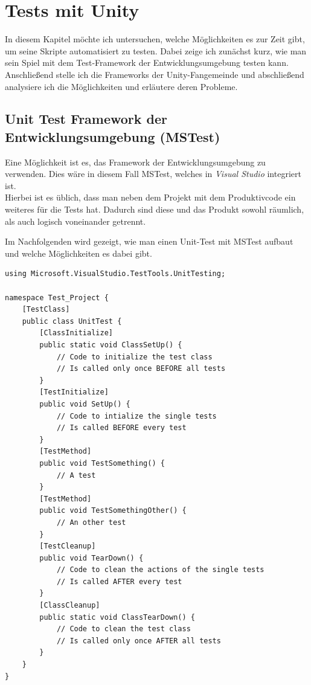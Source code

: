 \chapter{Tests mit Unity}
\label{sec:Tests mit Unity}

In diesem Kapitel möchte ich untersuchen, welche Möglichkeiten es zur Zeit gibt, um seine Skripte automatisiert zu testen. Dabei zeige ich zunächst kurz, wie man sein Spiel mit dem Test-Framework der Entwicklungsumgebung testen kann. Anschließend stelle ich die Frameworks der Unity-Fangemeinde und abschließend analysiere ich die Möglichkeiten und erläutere deren Probleme.

\section{Unit Test Framework der Entwicklungsumgebung (MSTest)}

Eine Möglichkeit ist es, das Framework der Entwicklungsumgebung zu verwenden. Dies wäre in diesem Fall MSTest, welches in \textit{Visual Studio} integriert ist.\\
Hierbei ist es üblich, dass man neben dem Projekt mit dem Produktivcode ein weiteres für die Tests hat. Dadurch sind diese und das Produkt sowohl räumlich, als auch logisch voneinander getrennt.

Im Nachfolgenden wird gezeigt, wie man einen Unit-Test mit MSTest aufbaut und welche Möglichkeiten es dabei gibt.

\pagebreak
\begin{lstlisting}[caption={[Unit Test mit MSTest]Unit Test mit MSTest\\
Beispiel einer Testklasse in MSTest. Zeigt wie man ihre Testmethoden deklariert und wie sie initialisiert wird.}, label=code:UnitTestMitMSTest]
using Microsoft.VisualStudio.TestTools.UnitTesting;

namespace Test_Project {
	[TestClass]
	public class UnitTest {
		[ClassInitialize]
		public static void ClassSetUp() {
			// Code to initialize the test class
			// Is called only once BEFORE all tests
		}
		[TestInitialize]
		public void SetUp() {
			// Code to intialize the single tests
			// Is called BEFORE every test
		}
		[TestMethod]
		public void TestSomething() {
			// A test
		}			
		[TestMethod]
		public void TestSomethingOther() {
			// An other test
		}
		[TestCleanup]
		public void TearDown() {
			// Code to clean the actions of the single tests
			// Is called AFTER every test
		}
		[ClassCleanup]
		public static void ClassTearDown() {
			// Code to clean the test class
			// Is called only once AFTER all tests
		}
	}
}
\end{lstlisting}
\pagebreak

